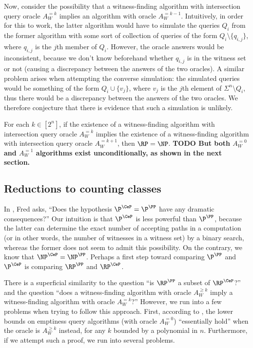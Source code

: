 \documentclass{article}
\newcommand{\todo}[1]{\textbf{TODO #1}}
\begin{document}
Now, consider the possibility that a witness-finding algorithm with intersection query oracle $A^{= k}_W$ implies an algorithm with oracle $A^{= k - 1}_W$.
Intuitively, in order for this to work, the latter algorithm would have to simulate the queries $Q_i$ from the former algorithm with some sort of collection of queries of the form $Q_i \setminus \{q_{i, j}\}$, where $q_{i, j}$ is the $j$th member of $Q_i$.
However, the oracle answers would be inconsistent, because we don't know beforehand whether $q_{i, j}$ is in the witness set or not (causing a discrepancy between the answers of the two oracles).
A similar problem arises when attempting the converse simulation: the simulated queries would be something of the form $Q_i \cup \{v_j\}$, where $v_j$ is the $j$th element of $\Sigma^n \setminus Q_i$, thus there would be a discrepancy between the answers of the two oracles.
We therefore conjecture that there is evidence that such a simulation is unlikely.

\begin{conjecture}
  For each $k \in \left[2^n\right]$, if the existence of a witness-finding algorithm with intersection query oracle $A^{= k}_W$ implies the existence of a witness-finding algorithm with intersection query oracle $A^{= k + 1}_W$, then $\RP = \NP$.
  \todo{But both $A^{= 0}_W$ and $A^{= 1}_W$ algorithms exist unconditionally, as shown in the next section.}
\end{conjecture}

\subsection{Reductions to counting classes}

In \autocite[Section~7]{green93}, Fred asks, ``Does the hypothesis $\P^{\CeP} = \P^\PP$ have any dramatic consequences?''
Our intuition is that $\P^{\CeP}$ is less powerful than $\P^\PP$, because the latter can determine the exact number of accepting paths in a computation (or in other words, the number of witnesses in a witness set) by a binary search, whereas the former does not seem to admit this possibility.
On the contrary, we know that $\NP^{\CeP} = \NP^\PP$.
Perhaps a first step toward comparing $\P^\PP$ and $\P^{\CeP}$ is comparing $\RP^\PP$ and $\RP^{\CeP}$.

There is a superficial similarity to the question ``is $\RP^\PP$ a subset of $\RP^{\CeP}$?'' and the question ``does a witness-finding algorithm with oracle $A^{\geq k}_W$ imply a witness-finding algorithm with oracle $A^{= k}_W$?''
However, we run into a few problems when trying to follow this approach.
First, according to \autocite[Remark~2]{krw12}, the lower bounds on emptiness query algorithms (with oracle $A^{=0}_W$) ``essentially hold'' when the oracle is $A^{\geq k}_W$ instead, for any $k$ bounded by a polynomial in $n$.
Furthermore, if we attempt such a proof, we run into several problems.
\end{document}

